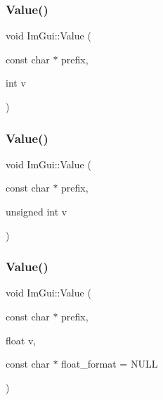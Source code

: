 \hypertarget{namespace_im_gui_a654ceb70f2dd1598f88861f54764ee08}{}\label{namespace_im_gui_a654ceb70f2dd1598f88861f54764ee08} 
\subsubsection{\texorpdfstring{Value()}{Value()}\hspace{0.1cm}{\footnotesize\ttfamily [2/4]}}
{\footnotesize\ttfamily void Im\+Gui\+::\+Value (\begin{DoxyParamCaption}\item[{const char $\ast$}]{prefix,  }\item[{int}]{v }\end{DoxyParamCaption})}

\hypertarget{namespace_im_gui_aec80a3e35bf7c1ff5704334e5a3ebd5a}{}\label{namespace_im_gui_aec80a3e35bf7c1ff5704334e5a3ebd5a} 
\subsubsection{\texorpdfstring{Value()}{Value()}\hspace{0.1cm}{\footnotesize\ttfamily [3/4]}}
{\footnotesize\ttfamily void Im\+Gui\+::\+Value (\begin{DoxyParamCaption}\item[{const char $\ast$}]{prefix,  }\item[{unsigned int}]{v }\end{DoxyParamCaption})}

\hypertarget{namespace_im_gui_a0c8b87438082a1d0a46ae2a76090ca16}{}\label{namespace_im_gui_a0c8b87438082a1d0a46ae2a76090ca16} 
\subsubsection{\texorpdfstring{Value()}{Value()}\hspace{0.1cm}{\footnotesize\ttfamily [4/4]}}
{\footnotesize\ttfamily void Im\+Gui\+::\+Value (\begin{DoxyParamCaption}\item[{const char $\ast$}]{prefix,  }\item[{float}]{v,  }\item[{const char $\ast$}]{float\+\_\+format = {\ttfamily NULL} }\end{DoxyParamCaption})}

